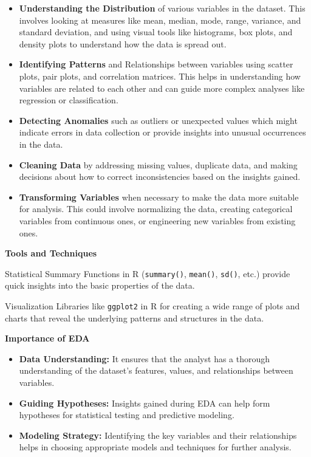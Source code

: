 \documentclass[
]{book}
\begin{document}
\begin{itemize}
\item
  \textbf{Understanding the Distribution} of various variables in the dataset. This involves looking at measures like mean, median, mode, range, variance, and standard deviation, and using visual tools like histograms, box plots, and density plots to understand how the data is spread out.
\item
  \textbf{Identifying Patterns} and Relationships between variables using scatter plots, pair plots, and correlation matrices. This helps in understanding how variables are related to each other and can guide more complex analyses like regression or classification.
\item
  \textbf{Detecting Anomalies} such as outliers or unexpected values which might indicate errors in data collection or provide insights into unusual occurrences in the data.
\item
  \textbf{Cleaning Data} by addressing missing values, duplicate data, and making decisions about how to correct inconsistencies based on the insights gained.
\item
  \textbf{Transforming Variables} when necessary to make the data more suitable for analysis. This could involve normalizing the data, creating categorical variables from continuous ones, or engineering new variables from existing ones.
\end{itemize}

\textbf{Tools and Techniques}

Statistical Summary Functions in R (\texttt{summary()}, \texttt{mean()}, \texttt{sd()}, etc.) provide quick insights into the basic properties of the data.

Visualization Libraries like \texttt{ggplot2} in R for creating a wide range of plots and charts that reveal the underlying patterns and structures in the data.

\textbf{Importance of EDA}

\begin{itemize}
\item
  \textbf{Data Understanding:} It ensures that the analyst has a thorough understanding of the dataset's features, values, and relationships between variables.
\item
  \textbf{Guiding Hypotheses:} Insights gained during EDA can help form hypotheses for statistical testing and predictive modeling.
\item
  \textbf{Modeling Strategy:} Identifying the key variables and their relationships helps in choosing appropriate models and techniques for further analysis.
\end{itemize}
\end{document}
